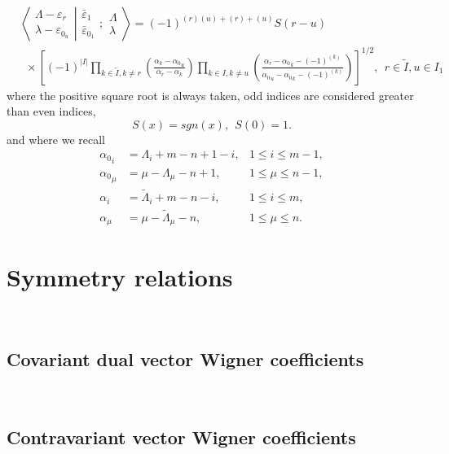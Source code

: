 \documentclass[12pt]{article}
\def\nn{\nonumber}
\begin{document}
\begin{align}
&\left\langle\left. 
\begin{array}{c} \Lambda-\varepsilon_r\\ \lambda-\varepsilon_{0_u} 
 \end{array}
\right|\right.
\left.
\begin{array}{c} \bar{\varepsilon}_1 \\ \bar{\varepsilon}_{0_1} 
 \end{array}
; \begin{array}{c} \Lambda \\ \lambda
 \end{array}
\right\rangle = (-1)^{(r)(u) +(r) + (u)} S(r-u) 
\nn\\
&~~\times
\left[
 (-1)^{|I|} \prod_{k\in \tilde{I},k\neq r} 
\left(
\frac 
{\alpha_k - {\alpha_0}_u  }
{\alpha_r - \alpha_k }
\right)
\prod_{k\in I,k \neq u} 
\left(
\frac
{ \alpha_r - {\alpha_0}_k - (-1)^{(k)} }
{{\alpha_0}_u - {\alpha_0}_k - (-1)^{(k)} }
\right)
\right]^{1/2}
,\ \ r\in \tilde{I},u\in I_1  \label{FinalUnBarredOdd}
\end{align}
where the positive square root is always taken, odd indices are considered greater than even indices, 
$$
S(x) = sgn(x),~~S(0)=1.
$$
and where we recall
\begin{align*}
{\alpha_0}_i &= \Lambda_i + m - n + 1 - i  , &1\leq i\leq m-1, \\
{\alpha_0}_\mu &= \mu - \Lambda_\mu -n + 1, &1\leq \mu \leq n-1 , \\
\alpha_i &= {\tilde{\Lambda}}_i + m - n - i, &1\leq i\leq m, \\
\alpha_\mu &= \mu-{\tilde{\Lambda}}_\mu - n, &1\leq \mu \leq n .  
\end{align*}


\section{Symmetry relations}

~~\
~~\
\subsection{Covariant dual vector Wigner coefficients}
~~\
~~\
\subsection{Contravariant vector Wigner coefficients}
~~\
~~\
\end{document}

